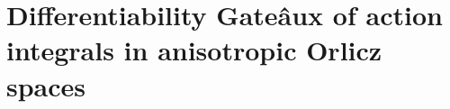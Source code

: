 \documentclass[twoside]{article}
\makeatletter
\newtheorem{thm}{Theorem}[section]
\newtheorem{defi}[thm]{Definition}
\theoremstyle{remark}
\def\namedlabel#1#2{\begingroup
    #2%
    \def\@currentlabel{#2}%
    \phantomsection\label{#1}\endgroup
}
\renewcommand{\b}[1]{\boldsymbol{#1}}
\newcommand{\rr}{\mathbb{R}}
\makeatother
\begin{document}
\section{Differentiability Gate\^aux of action integrals in anisotropic Orlicz spaces}
% 
% 
% 
% 
% 
% 
% 
% 
% 
\end{document}
